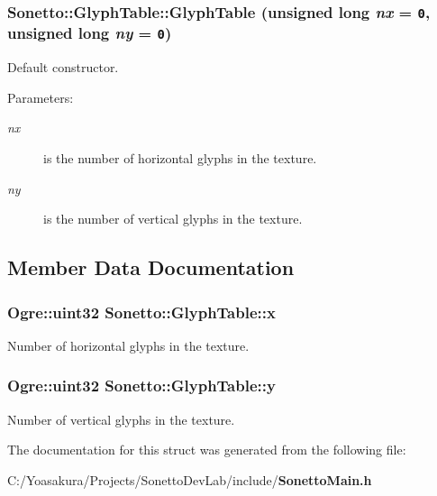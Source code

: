\subsubsection{\setlength{\rightskip}{0pt plus 5cm}Sonetto::GlyphTable::GlyphTable (unsigned long {\em nx} = {\tt 0}, unsigned long {\em ny} = {\tt 0})\hspace{0.3cm}{\tt  [inline]}}\label{struct_sonetto_1_1_glyph_table_e34c3b78f0bd1eb03f76ce24a34d733b}


Default constructor. 

\begin{Desc}
\item[Parameters:]
\begin{description}
\item[{\em nx}]is the number of horizontal glyphs in the texture. \item[{\em ny}]is the number of vertical glyphs in the texture. \end{description}
\end{Desc}


\subsection{Member Data Documentation}
\subsubsection{\setlength{\rightskip}{0pt plus 5cm}Ogre::uint32 {\bf Sonetto::GlyphTable::x}}\label{struct_sonetto_1_1_glyph_table_a119a681e5f7eb2c5ce77c6078aff956}


Number of horizontal glyphs in the texture. 

\subsubsection{\setlength{\rightskip}{0pt plus 5cm}Ogre::uint32 {\bf Sonetto::GlyphTable::y}}\label{struct_sonetto_1_1_glyph_table_ee71b68078a7f13f4211e8436281eba2}


Number of vertical glyphs in the texture. 



The documentation for this struct was generated from the following file:\begin{CompactItemize}
\item 
C:/Yoasakura/Projects/SonettoDevLab/include/{\bf SonettoMain.h}\end{CompactItemize}
